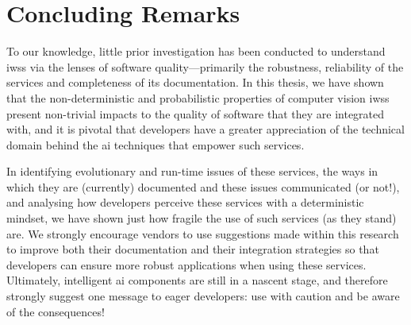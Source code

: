 
\section{Concluding Remarks}

To our knowledge, little prior investigation has been conducted to understand \glspl{iws} via the lenses of software quality---primarily the robustness, reliability of the services and completeness of its documentation. In this thesis, we have shown that the non-deterministic and probabilistic properties of computer vision \glspl{iws} present non-trivial impacts to the quality of software that they are integrated with, and it is pivotal that developers have a greater appreciation of the technical domain behind the \gls{ai} techniques that empower such services. 

In identifying evolutionary and run-time issues of these services, the ways in which they are (currently) documented and these issues communicated (or not!), and analysing how developers perceive these services with a deterministic mindset, we have shown just how fragile the use of such services (as they stand) are. We strongly encourage vendors to use suggestions made within this research to improve both their documentation and their integration strategies so that developers can ensure more robust applications when using these services. Ultimately, intelligent \gls{ai} components are still in a nascent stage, and therefore strongly suggest one message to eager developers: use with caution and be aware of the consequences!


